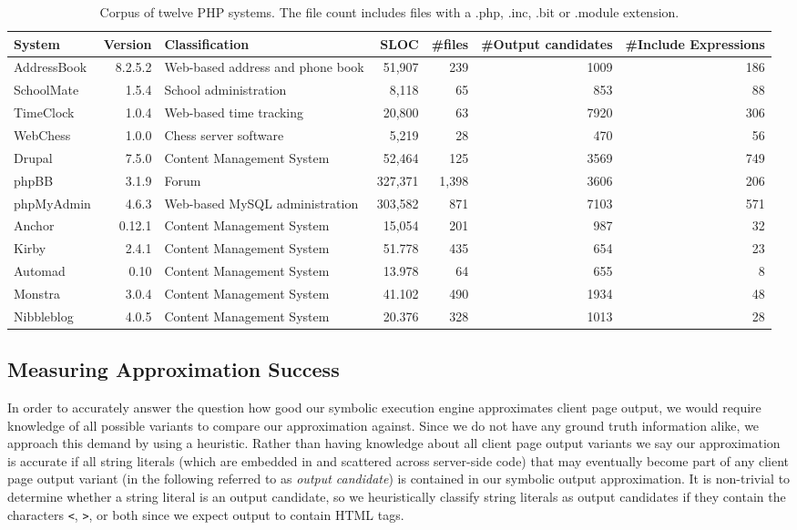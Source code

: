 \documentclass[sigconf]{acmart}
\renewcommand{\tt}[1]{\texttt{#1}}
\begin{document}
\begin{table*}[t]
\centering 
	\begin{tabular}{lrp{5cm}rrrr}
	\toprule
	\textbf{System} & \textbf{Version} & \textbf{Classification} & \textbf{SLOC} &
	\textbf{\#files} & \textbf{\#Output candidates} & \textbf{\#Include
	Expressions}\\
	\midrule
	AddressBook & 8.2.5.2 & Web-based address and phone book & 51,907 & 239  & 1009
	& 186\\
	SchoolMate & 1.5.4 & School administration & 8,118 & 65  & 853 & 88\\
	TimeClock & 1.0.4 & Web-based time tracking & 20,800 & 63  & 7920 & 306\\
	WebChess & 1.0.0 & Chess server software & 5,219 & 28  & 470 & 56\\
	\midrule
	Drupal & 7.5.0 & Content Management System &  52,464 & 125  & 3569 & 749\\
	phpBB & 3.1.9 & Forum & 327,371 & 1,398  & 3606 & 206\\
	phpMyAdmin & 4.6.3 & Web-based MySQL administration & 303,582 & 871  & 7103 &
	571\\
	\midrule
	Anchor & 0.12.1 & Content Management System & 15,054 & 201 & 987 & 32\\
	Kirby & 2.4.1 & Content Management System & 51.778 & 435  & 654 & 23\\
	Automad & 0.10 & Content Management System & 13.978 & 64  & 655 & 8\\
	Monstra & 3.0.4 & Content Management System & 41.102 & 490  & 1934 & 48\\
	Nibbleblog & 4.0.5 & Content Management System & 20.376 & 328  & 1013 & 28\\
	\bottomrule
	\end{tabular}
	\caption{Corpus of twelve PHP systems. The file count includes files with a .php,
	.inc, .bit or .module extension.}
	\label{corpus}
\end{table*}

\subsection{Measuring Approximation Success} \label{heuristic}
In order to accurately answer the question how good our symbolic execution
engine approximates client page output, we would require knowledge of all
possible variants to compare our approximation against. Since we do not have
any ground truth information alike, we approach this demand by using a
heuristic. Rather than having knowledge about all client page output variants
we say our approximation is accurate if all string literals (which are embedded
in and  scattered across server-side code) that may eventually become part of any
client page output variant (in the following referred to as \emph{output
candidate}) is contained in our symbolic output approximation.
It is non-trivial to determine whether a string literal is an output candidate,
so we heuristically classify string literals as output candidates if they
contain the characters \tt{<}, \tt{>}, or both since we expect output to contain
HTML tags.
\end{document}
